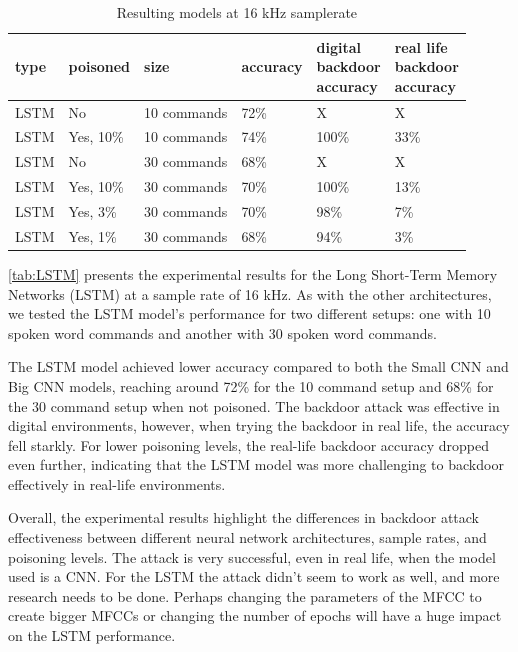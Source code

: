 \documentclass{report}
\theoremstyle{definition}
\theoremstyle{remark}
\begin{document}
\begin{table}[!hbt]
\centering
\begin{tabular}{|l|l|l|l|l|l|}
\hline
type & poisoned & size & accuracy &  \thead{digital \\ backdoor \\ accuracy} & \thead{real life \\ backdoor \\ accuracy} \\ \hline
LSTM & No  &  10 commands  &  72\% & X & X \\ \hline
LSTM & Yes, 10\%  &  10 commands  & 74\% & 100\% &  33\% \\ \hline
LSTM & No  &  30 commands  &   68\%  & X  & X   \\ \hline
LSTM & Yes, 10\%  &  30 commands  &  70\% & 100\% &  13\%     \\ \hline
LSTM & Yes, 3\%  &  30 commands  &  70\%  & 98\%  &  7\% \\ \hline
LSTM & Yes, 1\%  &  30 commands  &  68\%  & 94\%  &  3\% \\ \hline
\end{tabular}
\caption{Resulting models at 16 kHz samplerate}
\label{tab:LSTM}
\end{table}

\autoref{tab:LSTM} presents the experimental results for the Long Short-Term Memory Networks (LSTM) at a sample rate of 16 kHz. As with the other architectures, we tested the LSTM model's performance for two different setups: one with 10 spoken word commands and another with 30 spoken word commands.

The LSTM model achieved lower accuracy compared to both the Small CNN and Big CNN models, reaching around 72\% for the 10 command setup and 68\% for the 30 command setup when not poisoned. The backdoor attack was effective in digital environments, however, when trying the backdoor in real life, the accuracy fell starkly. For lower poisoning levels, the real-life backdoor accuracy dropped even further, indicating that the LSTM model was more challenging to backdoor effectively in real-life environments. 

Overall, the experimental results highlight the differences in backdoor attack effectiveness between different neural network architectures, sample rates, and poisoning levels. The attack is very successful, even in real life, when the model used is a CNN. For the LSTM the attack didn't seem to work as well, and more research needs to be done. Perhaps changing the parameters of the MFCC to create bigger MFCCs or changing the number of epochs will have a huge impact on the LSTM performance. 
\end{document}
